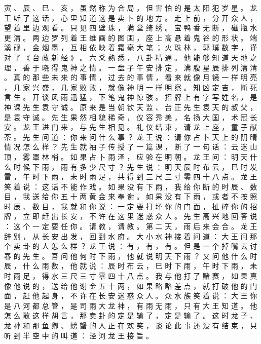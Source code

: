 {寅 、 辰 、 巳 、 亥 ， 虽 然 称 为 合 局 ， 但 害 怕 的 是 太 阳 犯 岁 星 。
龙 王 听 了 这 话 ， 心 里 知 道 这 是 卖 卜 的 地 方 。
走 上 前 ， 分 开 众 人 ， 望 着 里 边 观 看 。
只 见 四 壁 珠 ， 满 堂 绮 绣 。
宝 鸭 香 无 断 ， 磁 瓶 水 更 清 。
两 边 罗 列 着 王 维 画 的 图 画 ， 座 上 高 悬 着 鬼 谷 的 形 状 。
端 溪 砚 ， 金 烟 墨 ， 互 相 依 映 着 霜 毫 大 笔 ； 火 珠 林 ， 郭 璞 数 字 ， 谨 对 了 《 台 政 新 经 》 。
六 爻 熟 悉 ， 八 卦 精 通 。
他 能 够 知 道 天 地 之 理 ， 善 于 晓 得 鬼 神 之 情 。
一 盘 子 午 安 排 定 ， 满 腹 星 辰 排 列 清 清 。
真 的 那 些 未 来 的 事 情 ， 过 去 的 事 情 ， 看 来 就 像 月 镜 一 样 明 亮 ， 几 家 兴 盛 ， 几 家 败 败 ， 就 像 神 明 一 样 明 察 。
知 凶 定 吉 ， 断 死 言 生 。
开 谈 风 雨 迅 猛 ， 下 笔 鬼 神 惊 骇 。
招 牌 上 有 字 写 姓 名 ， 是 神 课 先 生 袁 守 诚 。
原 来 是 当 朝 钦 天 监 、 台 正 先 生 袁 天 的 叔 父 ， 是 袁 守 诚 。
先 生 果 然 相 貌 稀 奇 ， 仪 容 秀 美 ， 名 扬 大 国 ， 术 冠 长 安 。
龙 王 进 门 来 ， 与 先 生 相 见 。
礼 仪 结 束 ， 请 龙 上 座 ， 童 子 献 茶 。
先 生 问 道 ： 你 来 问 什 么 事 ？ 龙 王 说 ： 请 你 占 卜 天 上 的 阴 晴 情 况 怎 么 样 ？
先 生 就 袖 子 传 授 了 一 篇 课 ， 断 了 一 句 话 ： 云 迷 山 顶 ， 雾 罩 林 梢 。
如 果 占 卜 雨 泽 ， 应 验 在 明 朝 。
龙 王 问 ： 明 天 什 么 时 候 下 雨 ， 雨 有 多 少 尺 寸 ？ 先 生 说 ： 明 天 辰 时 布 云 ， 巳 时 发 雷 ， 午 时 下 雨 ， 未 时 雨 足 ， 共 得 到 三 尺 三 寸 零 四 十 八 点 。
龙 王 笑 着 说 ： 这 话 不 能 作 戏 。
如 果 没 有 下 雨 ， 我 给 你 断 的 时 辰 、 数 目 ， 我 送 给 你 五 十 两 黄 金 来 奉 谢 。 如 果 没 有 下 雨 ， 或 者 不 按 照 时 辰 、 数 目 ， 我 就 和 你 说 ： 一 定 要 打 坏 你 的 门 面 ， 扯 碎 你 的 招 牌 ， 立 即 赶 出 长 安 ， 不 许 在 这 里 迷 惑 众 人 。
先 生 高 兴 地 回 答 说 ： 这 个 一 定 要 任 你 。
请 教 ， 请 教 。
第 二 天 ， 雨 后 来 会 合 。
龙 王 辞 别 ， 从 长 安 出 发 ， 回 到 水 府 。
大 小 水 神 接 着 问 道 ： 大 王 问 那 个 卖 卦 的 人 怎 么 样 ？ 龙 王 说 ： 有 ， 有 ， 有 。
但 是 一 个 掉 嘴 去 讨 春 的 先 生 。
吾 问 他 何 时 下 雨 ， 他 就 说 明 天 下 雨 ？
又 问 他 什 么 时 辰 ， 什 么 雨 数 ， 他 就 说 ： 辰 时 布 云 ， 巳 时 下 雨 ， 午 时 下 雨 ， 未 时 雨 足 ， 得 水 三 尺 三 寸 零 四 十 八 点 。
我 与 他 打 了 赌 赛 ， 如 果 真 像 他 说 的 ， 送 给 他 谢 金 五 十 两 ， 如 果 略 略 差 点 ， 就 打 破 他 的 门 面 ， 赶 他 起 身 ， 不 许 在 长 安 迷 惑 众 人 。
众 水 族 笑 着 说 ： 大 王 你 是 八 河 都 总 管 ， 是 司 雨 大 龙 神 ， 有 雨 无 雨 ， 只 有 大 王 知 道 。
他 怎 么 敢 这 样 胡 言 ， 那 卖 卦 的 定 是 输 了 ， 定 是 输 了 。
这 时 龙 子 、 龙 孙 和 那 鱼 卿 、 螃 蟹 的 人 正 在 欢 笑 ， 谈 论 此 事 还 没 有 结 束 ， 只 听 到 半 空 中 的 叫 道 ： 泾 河 龙 王 接 旨 。
}
